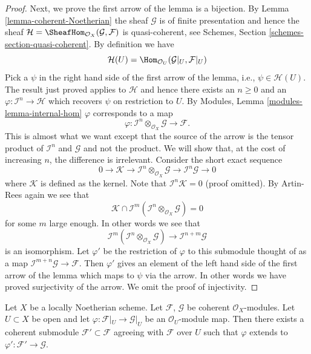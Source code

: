 \begin{proof}
\medskip\noindent
Next, we prove the first arrow of the lemma is a bijection.
By Lemma \ref{lemma-coherent-Noetherian} the sheaf $\mathcal{G}$
is of finite presentation and hence the sheaf
$\mathcal{H} = \SheafHom_{\mathcal{O}_X}(\mathcal{G}, \mathcal{F})$
is quasi-coherent, see
Schemes, Section \ref{schemes-section-quasi-coherent}.
By definition we have
$$
\mathcal{H}(U)
=
\Hom_{\mathcal{O}_U}(\mathcal{G}|_U, \mathcal{F}|_U)
$$
Pick a $\psi$ in the right hand side of the first arrow of the
lemma, i.e.,  $\psi \in \mathcal{H}(U)$. The result just proved applies
to $\mathcal{H}$ and hence there exists an $n \geq 0$ and an
$\varphi : \mathcal{I}^n \to \mathcal{H}$ which recovers
$\psi$ on restriction to $U$. By
Modules, Lemma \ref{modules-lemma-internal-hom}
$\varphi$ corresponds to a map
$$
\varphi :
\mathcal{I}^n \otimes_{\mathcal{O}_X} \mathcal{G}
\longrightarrow
\mathcal{F}.
$$
This is almost what we want except that the source of the arrow
is the tensor product of $\mathcal{I}^n$ and $\mathcal{G}$
and not the product. We will show that, at the cost of increasing $n$,
the difference is irrelevant. Consider the short exact sequence
$$
0 \to \mathcal{K} \to
\mathcal{I}^n \otimes_{\mathcal{O}_X} \mathcal{G} \to
\mathcal{I}^n\mathcal{G} \to 0
$$
where $\mathcal{K}$ is defined as the kernel. Note that
$\mathcal{I}^n\mathcal{K} = 0$ (proof omitted). By Artin-Rees
again we see that
$$
\mathcal{K}
\cap
\mathcal{I}^m(\mathcal{I}^n \otimes_{\mathcal{O}_X} \mathcal{G})
=
0
$$
for some $m$ large enough. In other words we see that
$$
\mathcal{I}^m(\mathcal{I}^n \otimes_{\mathcal{O}_X} \mathcal{G})
\longrightarrow
\mathcal{I}^{n + m}\mathcal{G}
$$
is an isomorphism. Let $\varphi'$ be the restriction of
$\varphi$ to this submodule thought of as a map
$\mathcal{I}^{m + n}\mathcal{G} \to \mathcal{F}$.
Then $\varphi'$ gives an element
of the left hand side of the first arrow of the lemma which
maps to $\psi$ via the arrow. In other words we have proved surjectivity
of the arrow. We omit the proof of injectivity.
\end{proof}

\begin{lemma}
\label{lemma-extend-coherent}
Let $X$ be a locally Noetherian scheme. Let $\mathcal{F}$, $\mathcal{G}$
be coherent $\mathcal{O}_X$-modules. Let $U \subset X$ be open and
let $\varphi : \mathcal{F}|_U \to \mathcal{G}|_U$ be an
$\mathcal{O}_U$-module map. Then there exists a coherent
submodule $\mathcal{F}' \subset \mathcal{F}$ agreeing with
$\mathcal{F}$ over $U$ such that $\varphi$ extends to
$\varphi' : \mathcal{F}' \to \mathcal{G}$.
\end{lemma}

